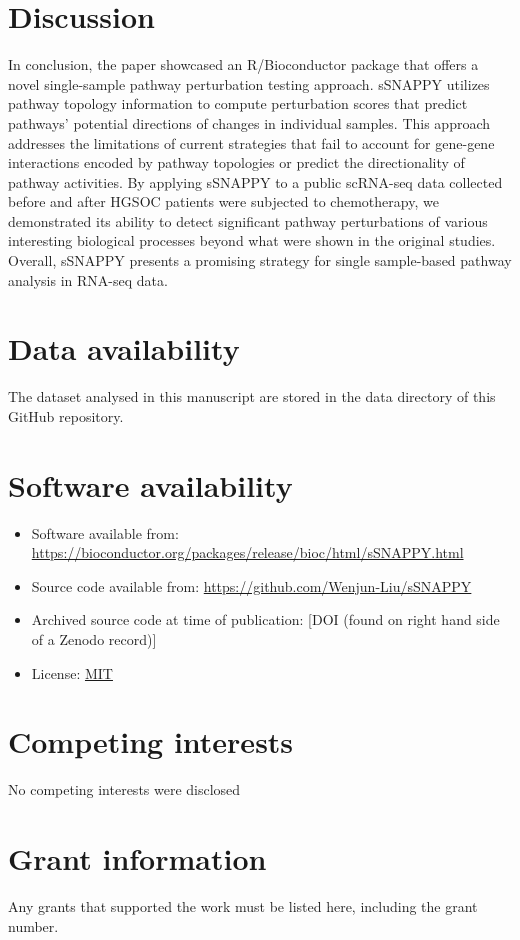\documentclass[9pt,a4paper,]{extarticle}
\begin{document}
\hypertarget{discussion}{%
\section{Discussion}\label{discussion}}

In conclusion, the paper showcased an R/Bioconductor package that offers a novel single-sample pathway perturbation testing approach. sSNAPPY utilizes pathway topology information to compute perturbation scores that predict pathways' potential directions of changes in individual samples. This approach addresses the limitations of current strategies that fail to account for gene-gene interactions encoded by pathway topologies or predict the directionality of pathway activities. By applying sSNAPPY to a public scRNA-seq data collected before and after HGSOC patients were subjected to chemotherapy, we demonstrated its ability to detect significant pathway perturbations of various interesting biological processes beyond what were shown in the original studies. Overall, sSNAPPY presents a promising strategy for single sample-based pathway analysis in RNA-seq data.

\hypertarget{data-availability}{%
\section{Data availability}\label{data-availability}}

The dataset analysed in this manuscript are stored in the data directory of this GitHub repository.

\hypertarget{software-availability}{%
\section{Software availability}\label{software-availability}}

\begin{itemize}
\item
  Software available from: \url{https://bioconductor.org/packages/release/bioc/html/sSNAPPY.html}
\item
  Source code available from: \url{https://github.com/Wenjun-Liu/sSNAPPY}
\item
  Archived source code at time of publication: {[}DOI (found on right hand side of a Zenodo record){]}
\item
  License: \href{https://opensource.org/license/mit/}{MIT}
\end{itemize}

\hypertarget{competing-interests}{%
\section{Competing interests}\label{competing-interests}}

No competing interests were disclosed

\hypertarget{grant-information}{%
\section{Grant information}\label{grant-information}}

Any grants that supported the work must be listed here, including the grant number.

\renewcommand\refname{Acknowledgements}
{\small}
\end{document}

